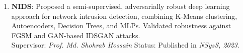\begin{enumerate}
    \item \textbf{NIDS}: Proposed a semi-supervised, adversarially robust deep learning approach for network intrusion detection, combining K-Means clustering, Autoencoders, Decision Trees, and MLPs. Validated robustness against FGSM and GAN-based IDSGAN attacks.\\
    Supervisor: \textit{Prof. Md. Shohrab Hossain} \hfill Status: Published in \textit{NSysS, 2023}.

\end{enumerate}

\endinput
